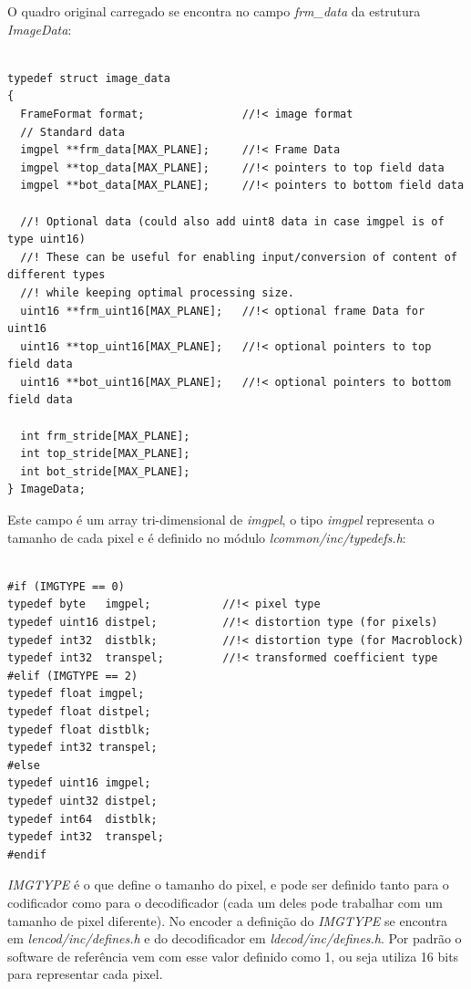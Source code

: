 O quadro original carregado se encontra no campo \textit{frm\_data} da estrutura \textit{ImageData}:

\begin{lstlisting}

typedef struct image_data
{
  FrameFormat format;               //!< image format
  // Standard data
  imgpel **frm_data[MAX_PLANE];     //!< Frame Data
  imgpel **top_data[MAX_PLANE];     //!< pointers to top field data
  imgpel **bot_data[MAX_PLANE];     //!< pointers to bottom field data

  //! Optional data (could also add uint8 data in case imgpel is of type uint16)
  //! These can be useful for enabling input/conversion of content of different types
  //! while keeping optimal processing size.
  uint16 **frm_uint16[MAX_PLANE];   //!< optional frame Data for uint16
  uint16 **top_uint16[MAX_PLANE];   //!< optional pointers to top field data
  uint16 **bot_uint16[MAX_PLANE];   //!< optional pointers to bottom field data

  int frm_stride[MAX_PLANE];
  int top_stride[MAX_PLANE];
  int bot_stride[MAX_PLANE];
} ImageData;

\end{lstlisting}

Este campo é um array tri-dimensional de \textit{imgpel}, o tipo \textit{imgpel} representa o tamanho de cada pixel e é definido no módulo \textit{lcommon/inc/typedefs.h}:

\begin{lstlisting}

#if (IMGTYPE == 0)
typedef byte   imgpel;           //!< pixel type
typedef uint16 distpel;          //!< distortion type (for pixels)
typedef int32  distblk;          //!< distortion type (for Macroblock)
typedef int32  transpel;         //!< transformed coefficient type
#elif (IMGTYPE == 2)
typedef float imgpel;
typedef float distpel;
typedef float distblk;
typedef int32 transpel;
#else
typedef uint16 imgpel;
typedef uint32 distpel;
typedef int64  distblk;
typedef int32  transpel;
#endif

\end{lstlisting}

\textit{IMGTYPE} é o que define o tamanho do pixel, e pode ser definido tanto para o codificador como para o decodificador (cada um deles pode trabalhar com um tamanho de pixel diferente). No encoder a definição do \textit{IMGTYPE} se encontra em \textit{lencod/inc/defines.h} e do decodificador em \textit{ldecod/inc/defines.h}. Por padrão o software de referência vem com esse valor definido como 1, ou seja utiliza 16 bits para representar cada pixel.

